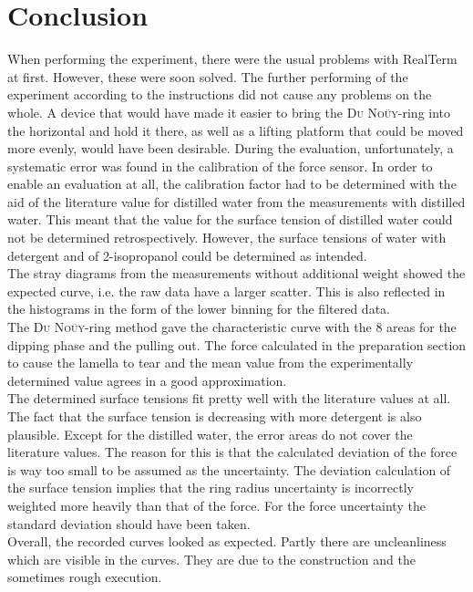 \chapter{Conclusion}
When performing the experiment, there were the usual problems with RealTerm at first. However, these were soon solved. The further performing of the experiment according to the instructions did not cause any problems on the whole. A device that would have made it easier to bring the \textsc{Du Noüy}-ring into the horizontal and hold it there, as well as a lifting platform that could be moved more evenly, would have been desirable. During the evaluation, unfortunately, a systematic error was found in the calibration of the force sensor. In order to enable an evaluation at all, the calibration factor had to be determined with the aid of the literature value for distilled water from the measurements with distilled water. This meant that the value for the surface tension of distilled water could not be determined retrospectively. However, the surface tensions of water with detergent and of 2-isopropanol could be determined as intended.\\
The stray diagrams from the measurements without additional weight showed the expected curve, i.e. the raw data have a larger scatter. This is also reflected in the histograms in the form of the lower binning for the filtered data.\\
The \textsc{Du Noüy}-ring method gave the characteristic curve with the 8 areas for the dipping phase and the pulling out. The force calculated in the preparation section to cause the lamella to tear and the mean value from the experimentally determined value agrees in a good approximation.\\
The determined surface tensions fit pretty well with the literature values at all. The fact that the surface tension is decreasing with more detergent is also plausible. Except for the distilled water, the error areas do not cover the literature values. The reason for this is that the calculated deviation of the force is way too small to be assumed as the uncertainty. The deviation calculation of the surface tension implies that the ring radius uncertainty is incorrectly weighted more heavily than that of the force. For the force uncertainty the standard deviation should have been taken.\\
Overall, the recorded curves looked as expected. Partly there are uncleanliness which are visible in the curves. They are due to the construction and the sometimes rough execution.
